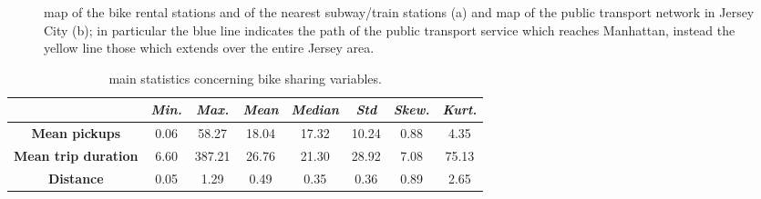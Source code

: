 \begin{figure}[h!]
	\centering
	\quad
	\quad
	\caption[]{map of the bike rental stations and of the nearest subway/train stations (a) and map of the public transport network in Jersey City (b); in particular the blue line indicates the path of the public transport service which reaches Manhattan, instead the yellow line those which extends over the entire Jersey area.}
	\label{Maps}
\end{figure} 
\begin{table}[h!]
	\centering
	\renewcommand\arraystretch{1.3}
	\begin{tabular}{c|c|c|c|c|c|c|c}
		\hline
		\textit{} & \textit{Min.} & \textit{Max.} & \textit{Mean} & \textit{Median} & \textit{Std} & \textit{Skew.}  & \textit{Kurt.}\\
		\hline
		\textbf{Mean pickups} & 0.06 & 58.27 & 18.04 & 17.32 & 10.24 & 0.88 & 4.35  \\
		\hline
		\textbf{Mean trip duration} & 6.60 & 387.21 & 26.76 & 21.30 & 28.92 & 7.08 & 75.13  \\
		\hline
		\textbf{Distance} & 0.05 & 1.29 & 0.49 & 0.35 & 0.36 & 0.89 & 2.65  \\
		\hline
	\end{tabular}
	\caption[Main statistics concerning bike sharing variables]{main statistics concerning bike sharing variables.}
	\label{Bike_sharing_stats}
\end{table}
